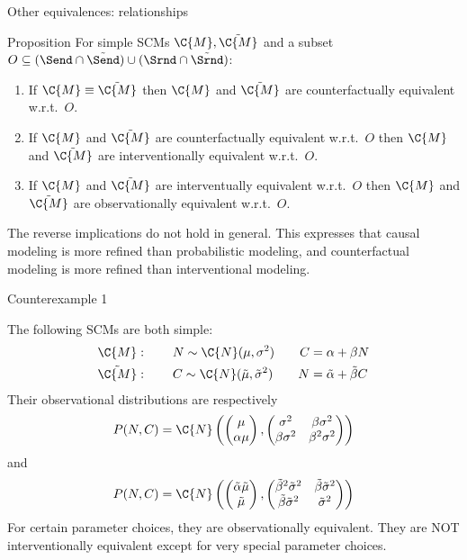 \begin{frame}{Other equivalences: relationships}
\begin{block}{Proposition}
  For simple SCMs $\C{M}, \tilde{\C{M}}$ and a subset $O \subseteq (\Send \cap \tilde{\Send}) \cup (\Srnd \cap \tilde{\Srnd})$:
  \begin{enumerate}
    \item If $\C{M} \equiv \tilde{\C{M}}$ then $\C{M}$ and $\tilde{\C{M}}$ are counterfactually equivalent w.r.t.\ $O$.
    \item If $\C{M}$ and $\tilde{\C{M}}$ are counterfactually equivalent w.r.t.\ $O$ then 
      $\C{M}$ and $\tilde{\C{M}}$ are interventionally equivalent w.r.t.\ $O$.
    \item If $\C{M}$ and $\tilde{\C{M}}$ are interventually equivalent w.r.t.\ $O$ then 
      $\C{M}$ and $\tilde{\C{M}}$ are observationally equivalent w.r.t.\ $O$.
  \end{enumerate}
\end{block}
The reverse implications do not hold in general. This expresses that causal modeling is more refined than
probabilistic modeling, and counterfactual modeling is more refined than interventional modeling.
\end{frame}

\begin{frame}{Counterexample 1}
\begin{example}
  The following SCMs are both simple:
  \begin{align*}
    \C{M} &: \qquad N \sim \C{N}(\mu,\sigma^2) \qquad C = \alpha + \beta N \\
    \tilde{\C{M}}&: \qquad C \sim \C{N}(\tilde{\mu},\tilde{\sigma}^2) \qquad N = \tilde{\alpha} + \tilde{\beta} C
  \end{align*}
Their observational distributions are respectively 
  $$P(N,C) = \C{N}\left(\begin{pmatrix} \mu \\ \alpha \mu \end{pmatrix}, \begin{pmatrix} \sigma^2 & \beta\sigma^2 \\ \beta\sigma^2 & \beta^2\sigma^2\end{pmatrix}\right)$$
and
  $$P(N,C) = \C{N}\left(\begin{pmatrix} \tilde{\alpha}\tilde{\mu} \\ \tilde{\mu} \end{pmatrix}, \begin{pmatrix} \tilde{\beta}^2\tilde{\sigma}^2 & \tilde{\beta}\tilde{\sigma}^2 \\ \tilde{\beta}\tilde{\sigma}^2 & \tilde{\sigma}^2\end{pmatrix}\right)$$
For certain parameter choices, they are observationally equivalent.
They are NOT interventionally equivalent except for very special parameter choices.
\end{example}
\end{frame}

